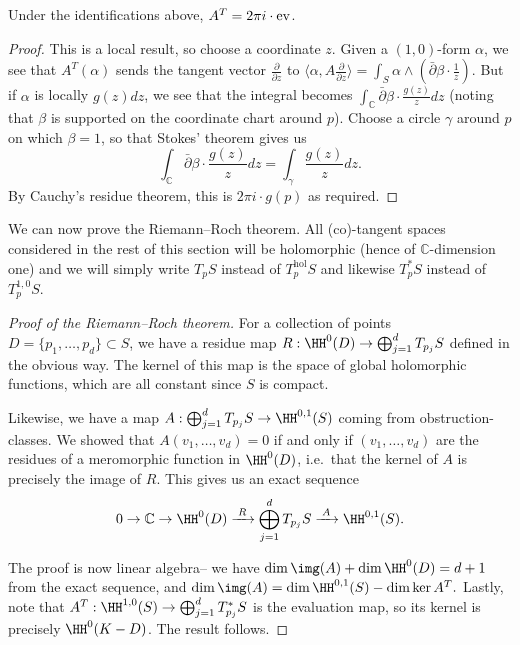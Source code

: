 \begin{lemma}
    Under the identifications above, \(A^T=2\pi i\cdot \textnormal{ev}\).
    \begin{proof}
        This is a local result, so choose a coordinate \(z\). Given a
        \((1,0)\)-form \(\alpha\), we see that \(A^T(\alpha)\) sends the tangent
        vector \(\frac{\partial}{\partial z}\) to \(\langle \alpha,
        A\frac{\partial }{\partial z}\rangle = \int_S \alpha \wedge
        (\bar\partial \beta \cdot \frac{1}{z}).\) But if \(\alpha\) is locally
        \(g(z)dz\), we see that the integral becomes \(\int_\mathbb{C}
        \bar\partial \beta\cdot \frac{g(z)}{z}dz\) (noting that \(\beta\) is
        supported on the coordinate chart around \(p\)). Choose a circle
        \(\gamma\) around \(p\) on which \(\beta=1\), so that Stokes' theorem
        gives us
        \[\int_\mathbb{C} \bar\partial \beta\cdot \frac{g(z)}{z}dz =
        \int_\gamma \frac{g(z)}{z}dz.\]
        By Cauchy's residue theorem, this is \(2\pi i\cdot  g(p)\) as required.
    \end{proof}
\end{lemma}

We can now prove the Riemann--Roch theorem.
All (co)-tangent spaces considered in the rest of this section will be
holomorphic (hence of \(\mathbb{C}\)-dimension one) and we will simply write
\(T_pS\) instead of \(T_p^\text{hol}S\) and likewise \(T_p^\ast S\) instead of
\(T_p^{1,0}S\).


\begin{proof}[Proof of the Riemann--Roch theorem]
    For a collection of points \(D=\{p_1,\ldots,p_d\}\subset S\), we
    have a residue map \(R: \HH^0(D)\to \bigoplus_{j=1}^d T_{p_j}S\)
    defined in the obvious way. The kernel of this map is the space of global
    holomorphic functions, which are all constant since \(S\) is compact.

    Likewise, we have a map \(A:\bigoplus_{j=1}^d T_{p_j}S\to \HH^{0,1}(S)\)
    coming from obstruction-classes. We showed that \(A(v_1,\ldots,v_d)=0\) if and
    only if \((v_1,\ldots,v_d)\) are the residues of a meromorphic function in
    \(\HH^0(D)\), i.e.\ that the kernel of \(A\) is precisely the image of
    \(R\). This gives us an exact sequence
    \[0\to \mathbb{C}\to \HH^0(D)\xrightarrow{\;R\;} \bigoplus_{j=1}^d T_{p_j}S
    \xrightarrow{\;A\;} \HH^{0,1}(S).\]

    The proof is now linear algebra-- we have \(\dim\img(A)+\dim\HH^0(D)=d+1\)
    from the exact sequence, and \(\dim\img(A)=\dim\HH^{0,1}(S)-\dim \ker
    A^T.\) Lastly, note that \(A^T:\HH^{1,0}(S)\to \bigoplus_{j=1}^d
    T_{p_j}^\ast S\) is the evaluation map, so its kernel is precisely
    \(\HH^0(K-D)\). The result follows.
\end{proof}

